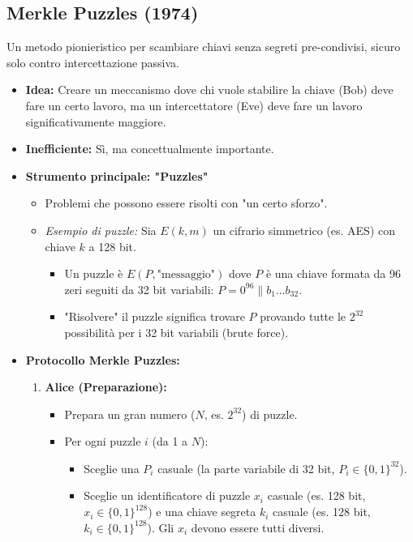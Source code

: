 \documentclass{article}
\begin{document}
\subsection{Merkle Puzzles (1974)}
Un metodo pionieristico per scambiare chiavi senza segreti pre-condivisi, sicuro solo contro intercettazione passiva.
\begin{itemize}
    \item \textbf{Idea:} Creare un meccanismo dove chi vuole stabilire la chiave (Bob) deve fare un certo lavoro, ma un intercettatore (Eve) deve fare un lavoro significativamente maggiore.
    \item \textbf{Inefficiente:} Sì, ma concettualmente importante.
    \item \textbf{Strumento principale: "Puzzles"}
        \begin{itemize}
            \item Problemi che possono essere risolti con "un certo sforzo".
            \item \textit{Esempio di puzzle:} Sia $E(k,m)$ un cifrario simmetrico (es. AES) con chiave $k$ a 128 bit.
                \begin{itemize}
                    \item Un puzzle è $E(P, \text{"messaggio"})$ dove $P$ è una chiave formata da 96 zeri seguiti da 32 bit variabili: $P = 0^{96} \parallel b_1 \dots b_{32}$.
                    \item "Risolvere" il puzzle significa trovare $P$ provando tutte le $2^{32}$ possibilità per i 32 bit variabili (brute force).
                \end{itemize}
        \end{itemize}
    \item \textbf{Protocollo Merkle Puzzles:}
        \begin{enumerate}
            \item \textbf{Alice (Preparazione):}
                \begin{itemize}
                    \item Prepara un gran numero ($N$, es. $2^{32}$) di puzzle.
                    \item Per ogni puzzle $i$ (da 1 a $N$):
                        \begin{itemize}
                            \item Sceglie una $P_i$ casuale (la parte variabile di 32 bit, $P_i \in \{0,1\}^{32}$).
                            \item Sceglie un identificatore di puzzle $x_i$ casuale (es. 128 bit, $x_i \in \{0,1\}^{128}$) e una chiave segreta $k_i$ casuale (es. 128 bit, $k_i \in \{0,1\}^{128}$). Gli $x_i$ devono essere tutti diversi.

\end{itemize}
\end{itemize}
\end{enumerate}
\end{itemize}
\end{document}

